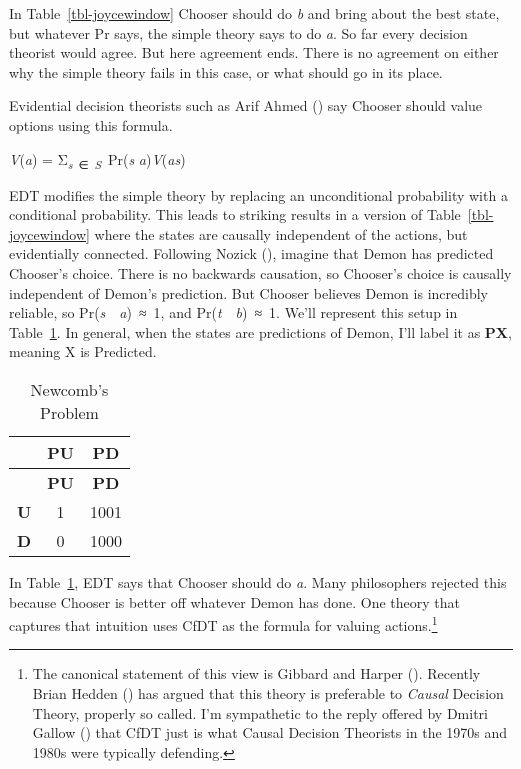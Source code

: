 \documentclass[
  10pt,
  letterpaper,
  DIV=11,
  numbers=noendperiod,
  twoside]{scrartcl}
\providecommand{\tightlist}{%
  \setlength{\itemsep}{0pt}\setlength{\parskip}{0pt}}\usepackage{longtable,booktabs,array}
\begin{document}
In Table~\ref{tbl-joycewindow} Chooser should do \emph{b} and bring
about the best state, but whatever Pr says, the simple theory says to do
\emph{a}. So far every decision theorist would agree. But here agreement
ends. There is no agreement on either why the simple theory fails in
this case, or what should go in its place.

Evidential decision theorists such as Arif Ahmed
() say Chooser should value options using
this formula.

\begin{description}
\tightlist
\item[EDT]
\emph{V}(\emph{a}) = Σ\textsubscript{\emph{s}~∈~\emph{S}}~Pr(\emph{s}
\textbar{} \emph{a})\emph{V}(\emph{as})
\end{description}

EDT modifies the simple theory by replacing an unconditional probability
with a conditional probability. This leads to striking results in a
version of Table~\ref{tbl-joycewindow} where the states are causally
independent of the actions, but evidentially connected. Following Nozick
(), imagine that Demon has predicted
Chooser's choice. There is no backwards causation, so Chooser's choice
is causally independent of Demon's prediction. But Chooser believes
Demon is incredibly reliable, so Pr(\emph{s}~\textbar~\emph{a})~≈~1, and
Pr(\emph{t}~\textbar~\emph{b})~≈~1. We'll represent this setup in
Table~\ref{tbl-newcomb}. In general, when the states are predictions of
Demon, I'll label it as \textbf{PX}, meaning X is Predicted.

\begin{longtable}[]{@{}ccc@{}}
\caption{Newcomb's Problem}\label{tbl-newcomb}\tabularnewline
\toprule\noalign{}
& \textbf{PU} & \textbf{PD} \\
\midrule\noalign{}
\endfirsthead
\toprule\noalign{}
& \textbf{PU} & \textbf{PD} \\
\midrule\noalign{}
\endhead
\bottomrule\noalign{}
\endlastfoot
\textbf{U} & 1 & 1001 \\
\textbf{D} & 0 & 1000 \\
\end{longtable}

In Table~\ref{tbl-newcomb}, EDT says that Chooser should do \emph{a}.
Many philosophers rejected this because Chooser is better off whatever
Demon has done. One theory that captures that intuition uses CfDT as the
formula for valuing actions.\footnote{The canonical statement of this
  view is Gibbard and Harper ().
  Recently Brian Hedden () has argued
  that this theory is preferable to \emph{Causal} Decision Theory,
  properly so called. I'm sympathetic to the reply offered by Dmitri
  Gallow () that CfDT just is what
  Causal Decision Theorists in the 1970s and 1980s were typically
  defending.}
\end{document}
